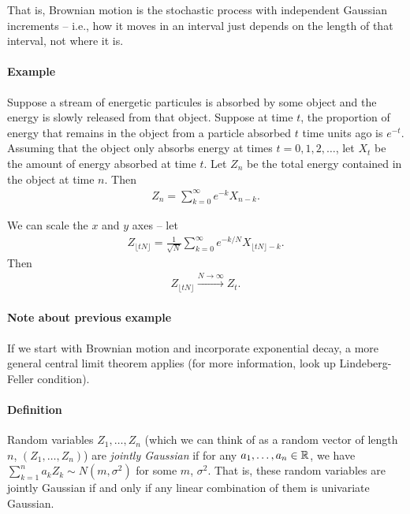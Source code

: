 \documentclass[../../../Master/AppliedStochastics.tex]{subfiles}
\begin{document}
That is, Brownian motion is the stochastic process with independent Gaussian increments 
-- i.e., how it moves in an interval just depends on the length of that interval, not where it is.

\paragraph{Example} Suppose a stream of energetic particules is absorbed by some object and the energy is slowly released from that object.  
Suppose at time $t$, the proportion of energy that remains in the object from a particle absorbed $t$ time units ago is $e^{-t}$.  
Assuming that the object only absorbs energy at times $t=0,1,2,\dots$, let $X_t$ be the amount of energy absorbed at time $t$.  
Let $Z_n$ be the total energy contained in the object at time $n$.  
Then 
$$\begin{aligned}
    Z_n=\sum_{k=0}^\infty e^{-k}X_{n-k}.
\end{aligned}$$


We can scale the $x$ and $y$ axes -- let 
$$\begin{aligned}
    Z_{\lfloor tN\rfloor}=\frac{1}{\sqrt{N}}\sum_{k=0}^\infty e^{-k/N}X_{\lfloor tN\rfloor-k}.
\end{aligned}$$
Then 
$$\begin{aligned}
    Z_{\lfloor tN\rfloor}\xrightarrow{N\to\infty}Z_t.
\end{aligned}$$



\paragraph{Note about previous example} 
If we start with Brownian motion and incorporate exponential decay, 
a more general central limit theorem applies (for more information, look up Lindeberg-Feller condition).

\paragraph{Definition} 
Random variables $Z_1,\dots,Z_n$ (which we can think of as a random vector of length $n$, $(Z_1,\dots,Z_n)$) are \emph{jointly Gaussian} 
if for any $a_1,\dots,a_n\in\mathbb{R}$, we have $\sum_{k=1}^n a_kZ_k\sim N(m,\sigma^2)$ for some $m$, $\sigma^2$.  
That is, these random variables are jointly Gaussian if and only if any linear combination of them is univariate Gaussian.
\end{document}
